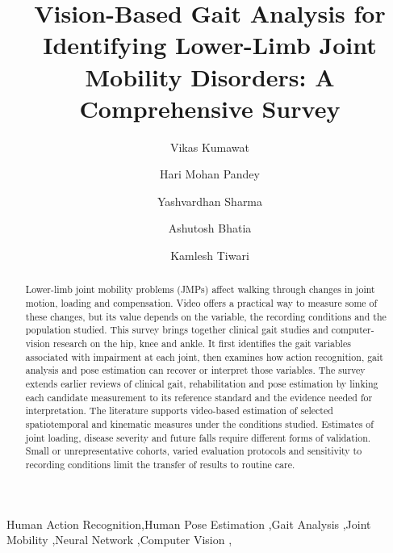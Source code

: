 \documentclass[12pt,nopreprintline]{elsarticle}
\begin{document}
\begin{frontmatter}

\title{\textbf{Vision-Based Gait Analysis for Identifying Lower-Limb Joint Mobility Disorders: A Comprehensive Survey}}

\author[bitsc]{Vikas Kumawat}
\author[BU]{Hari Mohan Pandey}
\author[bitsc]{Yashvardhan Sharma}
\author[bitsc]{Ashutosh Bhatia}
\author[jain]{Kamlesh Tiwari}

\address[bitsc]{Department of CSIS, Birla Institute of Technology and Science Pilani, Rajasthan, INDIA, 333031}
\address[BU]{School of Computing and Engineering, Bournemouth University, United Kingdom} 
\address[jain]{Department of CSE, Jain University, Bangalore, INDIA}

\begin{abstract}
\begin{revision}
Lower-limb joint mobility problems (JMPs) affect walking through changes in joint motion, loading and compensation. Video offers a practical way to measure some of these changes, but its value depends on the variable, the recording conditions and the population studied. This survey brings together clinical gait studies and computer-vision research on the hip, knee and ankle. It first identifies the gait variables associated with impairment at each joint, then examines how action recognition, gait analysis and pose estimation can recover or interpret those variables. The survey extends earlier reviews of clinical gait, rehabilitation and pose estimation by linking each candidate measurement to its reference standard and the evidence needed for interpretation. The literature supports video-based estimation of selected spatiotemporal and kinematic measures under the conditions studied. Estimates of joint loading, disease severity and future falls require different forms of validation. Small or unrepresentative cohorts, varied evaluation protocols and sensitivity to recording conditions limit the transfer of results to routine care. 
\end{revision}

\end{abstract}

\begin{keyword}
Human Action Recognition\sep Human Pose Estimation \sep Gait Analysis \sep Joint Mobility \sep Neural Network \sep Computer Vision \sep {} 
\end{keyword}

\end{frontmatter}
\end{document}

